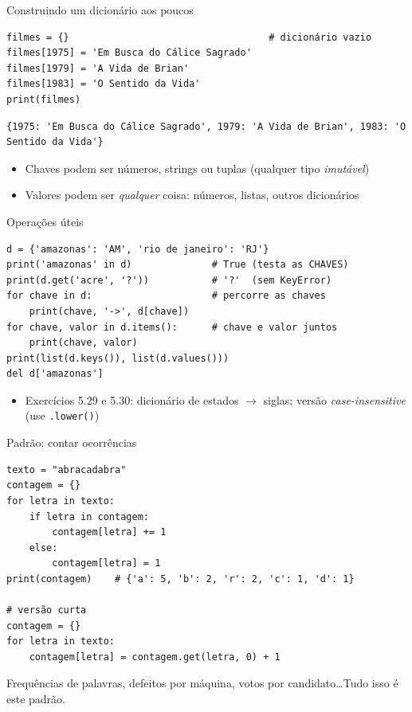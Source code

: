 \documentclass[aspectratio=169,10pt,t]{beamer}
\begin{document}
\begin{frame}[fragile]{Construindo um dicionário aos poucos}
\begin{lstlisting}
filmes = {}                                   # dicionário vazio
filmes[1975] = 'Em Busca do Cálice Sagrado'
filmes[1979] = 'A Vida de Brian'
filmes[1983] = 'O Sentido da Vida'
print(filmes)
\end{lstlisting}
\begin{lstlisting}[style=saida,basicstyle=\ttfamily\scriptsize]
{1975: 'Em Busca do Cálice Sagrado', 1979: 'A Vida de Brian', 1983: 'O Sentido da Vida'}
\end{lstlisting}
  \begin{itemize}
    \item Chaves podem ser números, strings ou tuplas (qualquer tipo \emph{imutável})
    \item Valores podem ser \emph{qualquer} coisa: números, listas, outros dicionários
  \end{itemize}
\end{frame}

\begin{frame}[fragile]{Operações úteis}
\begin{lstlisting}
d = {'amazonas': 'AM', 'rio de janeiro': 'RJ'}
print('amazonas' in d)              # True (testa as CHAVES)
print(d.get('acre', '?'))           # '?'  (sem KeyError)
for chave in d:                     # percorre as chaves
    print(chave, '->', d[chave])
for chave, valor in d.items():      # chave e valor juntos
    print(chave, valor)
print(list(d.keys()), list(d.values()))
del d['amazonas']
\end{lstlisting}
  \begin{itemize}
    \item Exercícios 5.29 e 5.30: dicionário de estados \(\to\) siglas; versão \emph{case-insensitive} (use \texttt{.lower()})
  \end{itemize}
\end{frame}

\begin{frame}[fragile]{Padrão: contar ocorrências}
\begin{lstlisting}
texto = "abracadabra"
contagem = {}
for letra in texto:
    if letra in contagem:
        contagem[letra] += 1
    else:
        contagem[letra] = 1
print(contagem)    # {'a': 5, 'b': 2, 'r': 2, 'c': 1, 'd': 1}

# versão curta
contagem = {}
for letra in texto:
    contagem[letra] = contagem.get(letra, 0) + 1
\end{lstlisting}
  \small Frequências de palavras, defeitos por máquina, votos por candidato\ldots Tudo isso é este padrão.
\end{frame}
\end{document}
